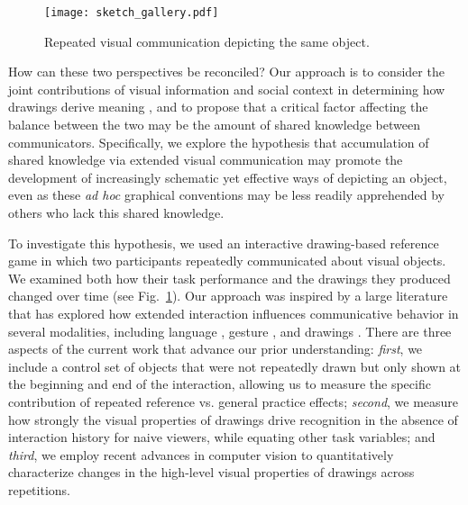 \begin{figure}
\begin{center}
\texttt{[image: sketch\_gallery.pdf]}
\caption{Repeated visual communication depicting the same object.}
\label{sketch_gallery}
\end{center}
\vspace{-1em}
\end{figure}

How can these two perspectives be reconciled?
Our approach is to consider the joint contributions of visual information and social context in determining how drawings derive meaning \cite{abell2009canny}, and to propose that a critical factor affecting the balance between the two may be the amount of shared knowledge between communicators.
Specifically, we explore the hypothesis that accumulation of shared knowledge via extended visual communication may promote the development of increasingly schematic yet effective ways of depicting an object, even as these \textit{ad hoc} graphical conventions may be less readily apprehended by others who lack this shared knowledge.

To investigate this hypothesis, we used an interactive drawing-based reference game in which two participants repeatedly communicated about visual objects.
We examined both how their task performance and the drawings they produced changed over time (see Fig.~\ref{sketch_gallery}).
Our approach was inspired by a large literature that has explored how extended interaction influences communicative behavior in several modalities, including language \cite{ClarkWilkesGibbs86_ReferringCollaborative,HawkinsFrankGoodman17_ConventionFormation}, gesture \cite{goldin1996silence}, and drawings \cite{GarrodFayLeeOberlanderMacLeod07_GraphicalSymbolSystems,Galantucci05_EmergenceOfCommunication}.
There are three aspects of the current work that advance our prior understanding: \emph{first}, we include a control set of objects that were not repeatedly drawn but only shown at the beginning and end of the interaction, allowing us to measure the specific contribution of repeated reference vs. general practice effects; \emph{second}, we measure how strongly the visual properties of drawings drive recognition in the absence of interaction history for naive viewers, while equating other task variables; and \emph{third}, we employ recent advances in computer vision to quantitatively characterize changes in the high-level visual properties of drawings across repetitions.



